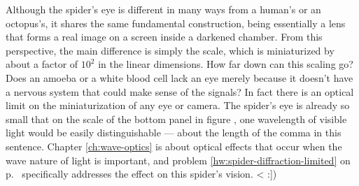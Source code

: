 Although the spider's eye is different in many ways from a human's or an octopus's, it shares the same fundamental
construction, being essentially a lens that forms a real image on a screen inside a darkened chamber. From this
perspective, the main difference is simply the scale, which is miniaturized by about a factor of $10^2$ in the linear dimensions.
How far down can this scaling go? Does an amoeba or a white blood cell lack an eye merely because it doesn't have a nervous
system that could make sense of the signals? In fact there is an optical limit on the miniaturization of any eye or camera.
The spider's eye is already so small that on the scale of the bottom panel in figure ,
one wavelength of visible light would be easily distinguishable --- about the length of the comma in this sentence.
Chapter \ref{ch:wave-optics} is about optical effects that occur when the wave nature of light is important,
and problem \ref{hw:spider-diffraction-limited} on p.~\pageref{hw:spider-diffraction-limited} specifically
addresses the effect on this spider's vision.
<%
:])
